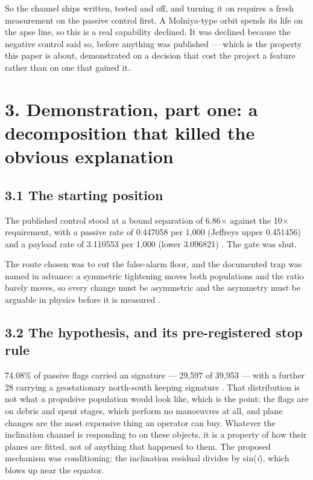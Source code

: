 \documentclass[11pt]{article}
\begin{document}
So the channel ships written, tested and off, and turning it on requires a fresh measurement on the passive control first. A Molniya-type orbit spends its life on the apse line, so this is a real capability declined. It was declined because the negative control said so, before anything was published --- which is the property this paper is about, demonstrated on a decision that cost the project a feature rather than on one that gained it.

\section*{3. Demonstration, part one: a decomposition that killed the obvious explanation}

\subsection*{3.1 The starting position}

The published control stood at a bound separation of 6.86$\times$ against the 10$\times$ requirement, with a passive rate of 0.447058 per 1,000 (Jeffreys upper 0.451456) and a payload rate of 3.110553 per 1,000 (lower 3.096821)%
. The gate was shut.

The route chosen was to cut the false-alarm floor, and the documented trap was named in advance: a symmetric tightening moves both populations and the ratio barely moves, so every change must be asymmetric and the asymmetry must be arguable in physics before it is measured%
.

\subsection*{3.2 The hypothesis, and its pre-registered stop rule}

74.08\% of passive flags carried an  signature --- 29,597 of 39,953 --- with a further 28 carrying a geostationary north-south keeping signature%
. That distribution is not what a propulsive population would look like, which is the point: the flags are on debris and spent stages, which perform no manoeuvres at all, and plane changes are the most expensive thing an operator can buy. Whatever the inclination channel is responding to on these objects, it is a property of how their planes are fitted, not of anything that happened to them. The proposed mechanism was conditioning: the inclination residual divides by sin(\emph{i}), which blows up near the equator.
\end{document}
